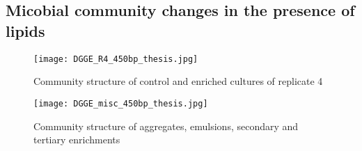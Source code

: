 \documentclass[11pt]{article}
\begin{document}
\subsection{Micobial community changes in the presence of lipids}

\begin{figure}
\texttt{[image: DGGE\_R4\_450bp\_thesis.jpg]}
\caption{Community structure of control and enriched cultures of replicate 4}
\end{figure}

\begin{figure}
\texttt{[image: DGGE\_misc\_450bp\_thesis.jpg]}
\caption{Community structure of aggregates, emulsions, secondary and tertiary enrichments}
\end{figure}
\end{document}
